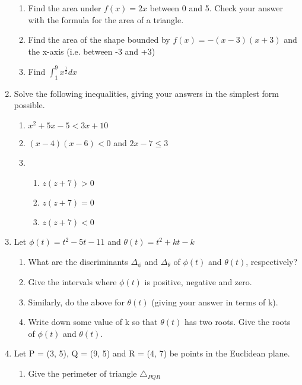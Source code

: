 \documentclass{article}
\begin{document}
\begin{enumerate}
\begin{enumerate}
			\item Find the area under $f(x) = 2x$ between 0 and 5.  Check your answer with the formula for the area of a triangle.
			
			\item Find the area of the shape bounded by $f(x) = -(x-3)(x+3)$ and the x-axis (i.e. between -3 and +3)
				
			\item Find $\int_1^9 x^{\frac{1}{2}} dx$

		\end{enumerate}
	
	\item Solve the following inequalities, giving your answers in the simplest form possible.
	
		\begin{enumerate}
			\item $x^2 + 5x - 5 < 3x + 10$
			
			\item $(x-4)(x-6) < 0$ and $2x - 7 \le 3$
			
			\item
			\begin{enumerate}
				\item $z(z+7) > 0$
				\item $z(z+7) = 0$
				\item $z(z+7) < 0$
			\end{enumerate}			
		\end{enumerate}


	\item Let $\phi(t) = t^2 - 5t - 11$ and $\theta(t) = t^2 + kt - k$
		\begin{enumerate}
			\item What are the discriminants $\Delta_{\phi}$ and $\Delta_{\theta}$ of $\phi(t)$ and $\theta(t)$, respectively?
			
			\item Give the intervals where $\phi(t)$ is positive, negative and zero.
			
			\item Similarly, do the above for $\theta(t)$ (giving your answer in terms of k).
			
			\item Write down some value of k so that $\theta(t)$ has two roots.  Give the roots of $\phi(t)$ and $\theta(t)$.
		\end{enumerate}


	
	
	\item Let P = (3, 5), Q = (9, 5) and R = (4, 7) be points in the Euclidean plane. 
	\begin{enumerate}
		\item Give the perimeter of triangle $\triangle_{PQR}$
		

\end{enumerate}
\end{enumerate}
\end{document}
